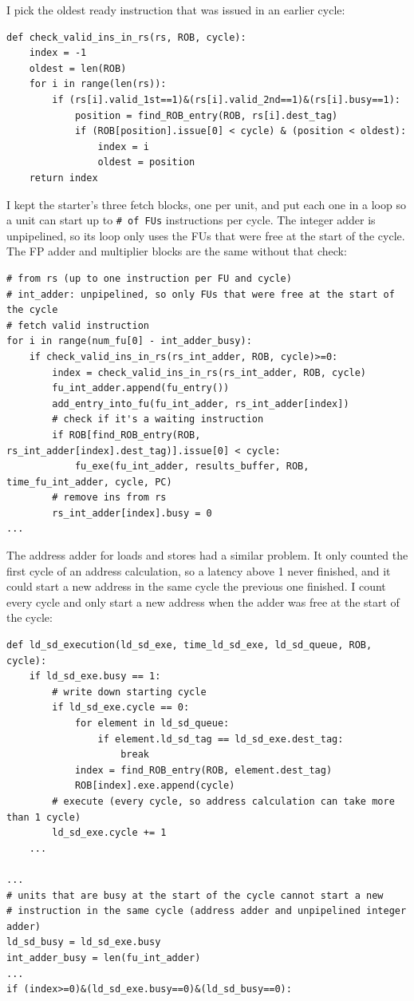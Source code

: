 \documentclass[11pt]{article}
\renewcommand{\_}{\origunderscore\allowbreak}
\begin{document}
I pick the oldest ready instruction that was issued in an earlier cycle:

\begin{lstlisting}
def check_valid_ins_in_rs(rs, ROB, cycle):
    index = -1
    oldest = len(ROB)
    for i in range(len(rs)):
        if (rs[i].valid_1st==1)&(rs[i].valid_2nd==1)&(rs[i].busy==1):
            position = find_ROB_entry(ROB, rs[i].dest_tag)
            if (ROB[position].issue[0] < cycle) & (position < oldest):
                index = i
                oldest = position
    return index
\end{lstlisting}

I kept the starter's three fetch blocks, one per unit, and put each one in a loop so a unit can
start up to \texttt{\# of FUs} instructions per cycle. The integer adder is unpipelined, so its
loop only uses the FUs that were free at the start of the cycle. The FP adder and multiplier
blocks are the same without that check:

\begin{lstlisting}
# from rs (up to one instruction per FU and cycle)
# int_adder: unpipelined, so only FUs that were free at the start of the cycle
# fetch valid instruction 
for i in range(num_fu[0] - int_adder_busy):
    if check_valid_ins_in_rs(rs_int_adder, ROB, cycle)>=0:
        index = check_valid_ins_in_rs(rs_int_adder, ROB, cycle)
        fu_int_adder.append(fu_entry())
        add_entry_into_fu(fu_int_adder, rs_int_adder[index])
        # check if it's a waiting instruction
        if ROB[find_ROB_entry(ROB, rs_int_adder[index].dest_tag)].issue[0] < cycle:
            fu_exe(fu_int_adder, results_buffer, ROB, time_fu_int_adder, cycle, PC)
        # remove ins from rs 
        rs_int_adder[index].busy = 0
...
\end{lstlisting}

The address adder for loads and stores had a similar problem. It only counted the first cycle of
an address calculation, so a latency above 1 never finished, and it could start a new address
in the same cycle the previous one finished. I count every cycle and only start a new address
when the adder was free at the start of the cycle:

\begin{lstlisting}
def ld_sd_execution(ld_sd_exe, time_ld_sd_exe, ld_sd_queue, ROB, cycle):
    if ld_sd_exe.busy == 1:
        # write down starting cycle
        if ld_sd_exe.cycle == 0:            
            for element in ld_sd_queue:
                if element.ld_sd_tag == ld_sd_exe.dest_tag:
                    break
            index = find_ROB_entry(ROB, element.dest_tag)
            ROB[index].exe.append(cycle)
        # execute (every cycle, so address calculation can take more than 1 cycle)
        ld_sd_exe.cycle += 1
    ...

...
# units that are busy at the start of the cycle cannot start a new
# instruction in the same cycle (address adder and unpipelined integer adder)
ld_sd_busy = ld_sd_exe.busy
int_adder_busy = len(fu_int_adder)
...
if (index>=0)&(ld_sd_exe.busy==0)&(ld_sd_busy==0):
\end{lstlisting}
\end{document}
